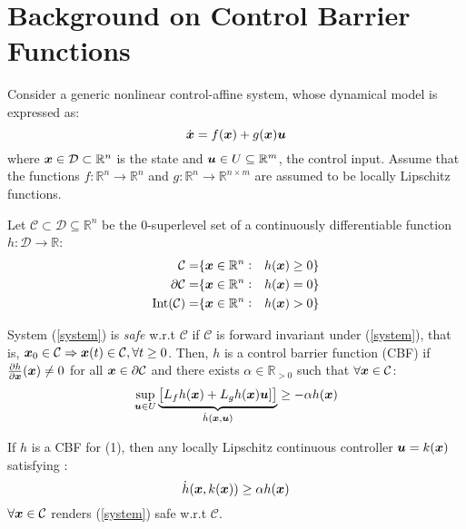 \section{Background on Control Barrier Functions}
Consider a generic nonlinear control-affine system, whose dynamical model is expressed as:
\begin{equation}
\dot{\boldsymbol{x}}=f(\boldsymbol{x})+g(\boldsymbol{x})\boldsymbol{u}
\label{system}
\end{equation}
where $\boldsymbol{x}\in\mathcal{D}\subset \mathbb{R}^n$ is the state and $\boldsymbol{u}\in U \subseteq \mathbb{R}^m$, the control input. Assume that the functions $f:\mathbb{R}^n\to\mathbb{R}^n$ and $g:\mathbb{R}^n\to\mathbb{R}^{n\times m} $ are assumed to be locally Lipschitz functions.
\begin{definition} Let $\mathcal{C}\subset \mathcal{D}\subseteq \mathbb{R}^n$ be the $0$-superlevel set of a continuously  differentiable function $h:\mathcal{D}\to\mathbb{R}$:
\begin{equation}
\begin{aligned}
\mathcal{C} =& \{\boldsymbol{x}\in\mathbb{R}^n :& h(\boldsymbol{x})\geq 0\} \\
\partial{\mathcal{C}} =& \{\boldsymbol{x}\in\mathbb{R}^n :& h(\boldsymbol{x})= 0\} \\
\mathrm{Int}({\mathcal{C}}) =& \{\boldsymbol{x}\in\mathbb{R}^n :& h(\boldsymbol{x})> 0\} \\
\end{aligned}
\end{equation}
\end{definition}
\begin{definition} System (\ref{system}) is \textit{safe} w.r.t $\mathcal{C}$ if $\mathcal{C}$ is forward invariant under (\ref{system}), that is, $\boldsymbol{x}_0\in\mathcal{C}\Rightarrow \boldsymbol{x}(t)\in\mathcal{C}, \forall t\geq0$.
Then, $h$ is a control barrier function (CBF) if $\frac{\partial{h}}{\partial \boldsymbol{x}} (\boldsymbol{x})\neq 0$ for all $\boldsymbol{x}\in \partial{\mathcal{C}}$ and there exists $\alpha \in \mathbb{R}_{>0}$ such that $\forall \boldsymbol{x} \in \mathcal{C}$: 
\begin{equation}
\sup_{\boldsymbol{u}\in U} \underbrace{ 
\begin{bmatrix}
L_fh(\boldsymbol{x}) + L_gh(\boldsymbol{x})\boldsymbol{u}] 
\end{bmatrix}}_{\dot{h}(\boldsymbol{x},\boldsymbol{u})}\geq -\alpha h(\boldsymbol{x})
\end{equation}
\begin{theorem}
    \label{theorem1}If $h$ is a CBF for (1), then any locally Lipschitz continuous controller $\boldsymbol{u} = k(\boldsymbol{x})$ satisfying : 
\begin{equation}
\dot{h}(\boldsymbol{x},k(\boldsymbol{x}))\geq \alpha h(\boldsymbol{x})
\label{cond:2}
\end{equation}
$\forall{\boldsymbol{x}}\in\mathcal{C}$ renders (\ref{system}) safe w.r.t $\mathcal{C}$. 
\end{theorem}
\end{definition}
